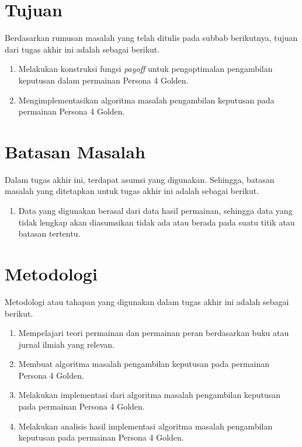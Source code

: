 \section{Tujuan}
Berdasarkan rumusan masalah yang telah ditulis pada subbab berikutnya, tujuan dari tugas akhir ini adalah sebagai berikut.
\begin{enumerate}
    \item Melakukan konstruksi fungsi \textit{payoff} untuk pengoptimalan pengambilan keputusan dalam permainan Persona 4 Golden.
    \item Mengimplementasikan algoritma masalah pengambilan keputusan pada permainan Persona 4 Golden.
\end{enumerate}

\section{Batasan Masalah}
Dalam tugas akhir ini, terdapat asumsi yang digunakan. Sehingga, batasan masalah yang ditetapkan untuk tugas akhir ini adalah sebagai berikut.
\begin{enumerate}
    \item Data yang digunakan berasal dari data hasil permainan, sehingga data yang tidak lengkap akan diasumsikan tidak ada atau berada pada suatu titik  atau batasan tertentu.
\end{enumerate}

\section{Metodologi}
Metodologi atau tahapan yang digunakan dalam tugas akhir ini adalah sebagai berikut.
\begin{enumerate}
    \item Mempelajari teori permainan dan permainan peran berdasarkan buku atau jurnal ilmiah yang relevan.
    \item Membuat algoritma masalah pengambilan keputusan pada permainan Persona 4 Golden.
    \item Melakukan implementasi dari algoritma masalah pengambilan keputusan pada permainan Persona 4 Golden.
    \item Melakukan analisis hasil implementasi algoritma masalah pengambilan keputusan pada permainan Persona 4 Golden.
\end{enumerate}
